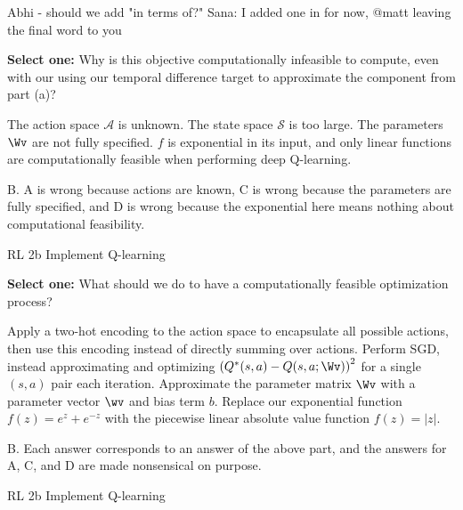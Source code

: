\begin{parts}
\begin{subparts}
\begin{qauthor}
Abhi - should we add "in terms of?"
Sana: I added one in for now, @matt leaving the final word to you
\end{qauthor}

\subpart[1] \textbf{Select one:} Why is this objective computationally infeasible to compute, even with our using our temporal difference target to approximate the component from part (a)?
\begin{checkboxes}
 \choice The action space $\mathcal{A}$ is unknown.
 \choice The state space $\mathcal{S}$ is too large.
 \choice The parameters $\Wv$ are not fully specified.
 \choice $f$ is exponential in its input, and only linear functions are computationally feasible when performing deep Q-learning.
\end{checkboxes}
\begin{soln}
B. A is wrong because actions are known, C is wrong because the parameters are fully specified, and D is wrong because the exponential here means nothing about computational feasibility.
\end{soln}
\begin{qauthor}
RL 2b Implement Q-learning
\end{qauthor}

\subpart[1] \textbf{Select one:} What should we do to have a computationally feasible optimization process?
\begin{checkboxes}
\choice Apply a two-hot encoding to the action space to encapsulate all possible actions, then use this encoding instead of directly summing over actions.
\choice Perform SGD, instead approximating and optimizing $\left( Q^* (s, a) - Q(s, a; \Wv) \right)^2$ for a single $(s, a)$ pair each iteration.
\choice Approximate the parameter matrix $\Wv$ with a parameter vector $\wv$ and bias term $b$.
\choice Replace our exponential function $f(z) = e^z + e^{-z}$ with the piecewise linear absolute value function $f(z) = |z|$.
\end{checkboxes}
\begin{soln}
B. Each answer corresponds to an answer of the above part, and the answers for A, C, and D are made nonsensical on purpose.
\end{soln}
\begin{qauthor}
RL 2b Implement Q-learning
\end{qauthor}

\end{subparts}



\end{parts}
